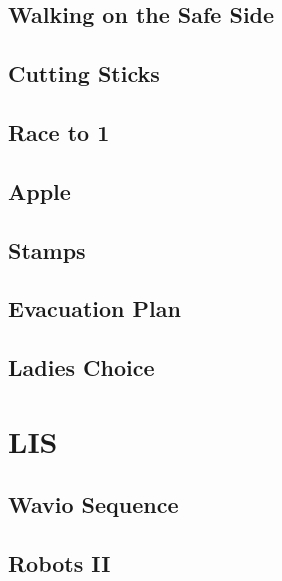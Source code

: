         \subsection{Walking on the Safe Side}
                
        \subsection{Cutting Sticks}
                
        \subsection{Race to 1}
                
        \subsection{Apple}
                
        \subsection{Stamps}
                
        \subsection{Evacuation Plan}
                
        \subsection{Ladies Choice}
                

\section{LIS}
        \subsection{Wavio Sequence}
                
        \subsection{Robots II}
                

